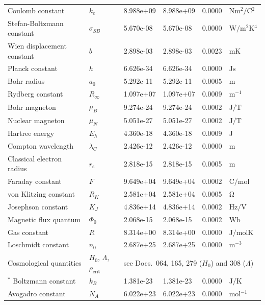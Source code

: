 \begin{longtable}{>{\raggedright}p{4.0cm}p{1.2cm}p{1.8cm}p{2.0cm}p{1.6cm}p{2.0cm}}
		Coulomb constant & $k_e$ & 8.988e+09 & 8.988e+09 & 0.0000 & $\si{\newton \meter^2 \per \coulomb^2}$ \\
		Stefan-Boltzmann constant & $\sigma_{SB}$ & 5.670e-08 & 5.670e-08 & 0.0000 & $\si{\watt \per \meter^2 \kelvin^4}$ \\
		Wien displacement constant & $b$ & 2.898e-03 & 2.898e-03 & 0.0023 & $\si{\meter \kelvin}$ \\
		Planck constant & $h$ & 6.626e-34 & 6.626e-34 & 0.0000 & $\si{\joule \second}$ \\
		Bohr radius & $a_0$ & 5.292e-11 & 5.292e-11 & 0.0005 & $\si{\meter}$ \\
		Rydberg constant & $R_\infty$ & 1.097e+07 & 1.097e+07 & 0.0009 & $\si{\meter^{-1}}$ \\
		Bohr magneton & $\mu_B$ & 9.274e-24 & 9.274e-24 & 0.0002 & $\si{\joule \per \tesla}$ \\
		Nuclear magneton & $\mu_N$ & 5.051e-27 & 5.051e-27 & 0.0002 & $\si{\joule \per \tesla}$ \\
		Hartree energy & $E_h$ & 4.360e-18 & 4.360e-18 & 0.0009 & $\si{\joule}$ \\
		Compton wavelength & $\lambda_C$ & 2.426e-12 & 2.426e-12 & 0.0000 & $\si{\meter}$ \\
		Classical electron radius & $r_e$ & 2.818e-15 & 2.818e-15 & 0.0005 & $\si{\meter}$ \\
		Faraday constant & $F$ & 9.649e+04 & 9.649e+04 & 0.0002 & $\si{\coulomb \per \mole}$ \\
		von Klitzing constant & $R_K$ & 2.581e+04 & 2.581e+04 & 0.0005 & $\si{\ohm}$ \\
		Josephson constant & $K_J$ & 4.836e+14 & 4.836e+14 & 0.0002 & $\si{\hertz \per \volt}$ \\
		Magnetic flux quantum & $\Phi_0$ & 2.068e-15 & 2.068e-15 & 0.0002 & $\si{\weber}$ \\
		Gas constant & $R$ & 8.314e+00 & 8.314e+00 & 0.0000 & $\si{\joule \per \mole \kelvin}$ \\
		Loschmidt constant & $n_0$ & 2.687e+25 & 2.687e+25 & 0.0000 & $\si{\meter^{-3}}$ \\
		Cosmological quantities & $H_0$, $\Lambda$, $\rho_{\text{crit}}$ & \multicolumn{4}{l}{see Docs.~064, 165, 279 ($H_0$) and 308 ($\Lambda$)} \\$^*$
		Boltzmann constant & $k_B$ & 1.381e-23 & 1.381e-23 & 0.0000 & $\si{\joule \per \kelvin}$ \\
		Avogadro constant & $N_A$ & 6.022e+23 & 6.022e+23 & 0.0000 & $\si{\mole^{-1}}$ \\
	\end{longtable}
	\normalsize
	
